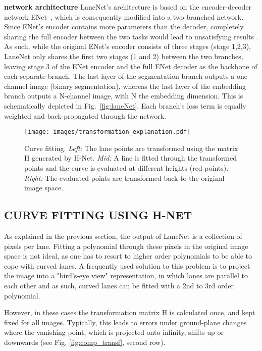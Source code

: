 \documentclass[letterpaper, 10 pt, conference]{ieeeconf}
\begin{document}
\textbf{network architecture} LaneNet's architecture is based on the encoder-decoder network ENet~\cite{Paszke16}, which is consequently modified into a two-branched network. Since ENet's encoder contains more parameters than the decoder, completely sharing the full encoder between the two tasks would lead to unsatisfying results \cite{Neven17}. As such, while the original ENet's encoder consists of three stages (stage 1,2,3), LaneNet only shares the first two stages (1 and 2) between the two branches, leaving stage 3 of the ENet encoder and the full ENet decoder as the backbone of each separate branch. The last layer of the segmentation branch outputs a one channel image (binary segmentation), whereas the last layer of the embedding branch outputs a N-channel image, with N the embedding dimension. This is schematically depicted in Fig.~\ref{fig:laneNet}. Each branch's loss term is equally weighted and back-propagated through the network.

\begin{figure}[t]
	\begin{center}
		\texttt{[image: images/transformation\_explanation.pdf]}
	\end{center}
	\caption{Curve fitting. 
    {\it Left:}
    The lane points are transformed using the matrix H generated by H-Net. 
    {\it Mid:}
    A line is fitted through the transformed points and the curve is evaluated at different heights (red points). 
    {\it Right:}
    The evaluated points are transformed back to the original image space.}
	\label{fig:transformation_explanation}
\end{figure}


\subsection{CURVE FITTING USING H-NET}
\label{subsec:lane_fitting}

As explained in the previous section, the output of LaneNet is a collection of pixels per lane. Fitting a polynomial through these pixels in the original image space is not ideal, as one has to resort to higher order polynomials to be able to cope with curved lanes. A frequently used solution to this problem is to project the image into a "bird's-eye view" representation, in which lanes are parallel to each other and as such, curved lanes can be fitted with a 2nd to 3rd order polynomial. 

However, in these cases the transformation matrix H is calculated once, and kept fixed for all images. Typically, this leads to errors under ground-plane changes where the vanishing-point, which is projected onto infinity, shifts up or downwards (see Fig. \ref{fig:comp_transf}, second row).
\end{document}
